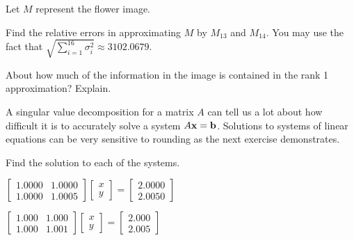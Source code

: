\begin{activity} Let $M$ represent the flower image.
	\ba
	\item Find the relative errors in approximating $M$ by $M_{13}$ and $M_{14}$. You may use the fact that  $\sqrt{\sum_{i=1}^{16} \sigma_i^2} \approx 3102.0679$.



	\item About how much of the information in the image is contained in the rank 1 approximation? Explain.
	
	
	
	\ea
\end{activity}



A singular value decomposition for a matrix $A$ can tell us a lot about how difficult it is to accurately solve a system $A \mathbf{x} = \mathbf{b}$. Solutions to systems of linear equations can be very sensitive to rounding as the next exercise demonstrates.



\begin{activity} \label{act:7_c_cond_num} Find the solution to each of the systems.
	\ba
	\item $\left[ \begin{array}{cc} 1.0000&1.0000 \\ 1.0000&1.0005 \end{array} \right] \left[ \begin{array}{c} x \\ y \end{array} \right] = \left[ \begin{array}{c} 2.0000 \\ 2.0050 \end{array} \right]$
	
	
	
	\item $\left[ \begin{array}{cc} 1.000&1.000 \\ 1.000&1.001 \end{array} \right] \left[ \begin{array}{c} x \\ y \end{array} \right] = \left[ \begin{array}{c} 2.000 \\ 2.005 \end{array} \right]$

	
	
	\ea
\end{activity}

